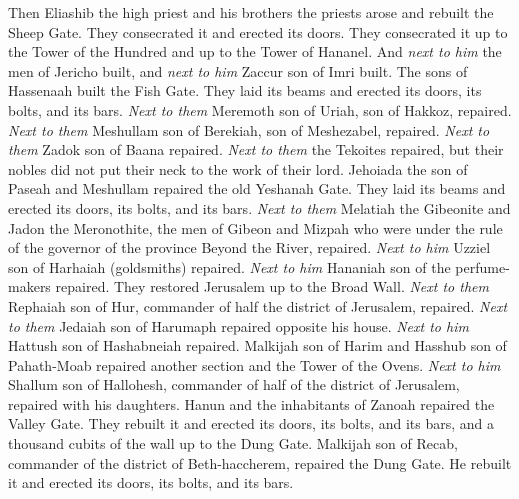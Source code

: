 \begin{biblechapter} %
 Then Eliashib the high priest and his brothers the priests arose and rebuilt the Sheep Gate. They consecrated it and erected its doors. They consecrated it up to the Tower of the Hundred and up to the Tower of Hananel.
\verse And \textit{next to him} the men of Jericho built, and \textit{next to him} Zaccur son of Imri built.
\verse The sons of Hassenaah built the Fish Gate. They laid its beams and erected its doors, its bolts, and its bars.
\verse \textit{Next to them} Meremoth son of Uriah, son of Hakkoz, repaired. \textit{Next to them} Meshullam son of Berekiah, son of Meshezabel, repaired. \textit{Next to them} Zadok son of Baana repaired.
\verse \textit{Next to them} the Tekoites repaired, but their nobles did not put their neck to the work of their lord.
\verse Jehoiada the son of Paseah and Meshullam repaired the old Yeshanah Gate. They laid its beams and erected its doors, its bolts, and its bars.
\verse \textit{Next to them} Melatiah the Gibeonite and Jadon the Meronothite, the men of Gibeon and Mizpah who were under the rule of the governor of the province Beyond the River, repaired.
\verse \textit{Next to him} Uzziel son of Harhaiah (goldsmiths) repaired. \textit{Next to him} Hananiah son of the perfume-makers repaired. They restored Jerusalem up to the Broad Wall.
\verse \textit{Next to them} Rephaiah son of Hur, commander of half the district of Jerusalem, repaired.
\verse \textit{Next to them} Jedaiah son of Harumaph repaired opposite his house. \textit{Next to him} Hattush son of Hashabneiah repaired.
\verse Malkijah son of Harim and Hasshub son of Pahath-Moab repaired another section and the Tower of the Ovens.
\verse \textit{Next to him} Shallum son of Hallohesh, commander of half of the district of Jerusalem, repaired with his daughters.
\verse Hanun and the inhabitants of Zanoah repaired the Valley Gate. They rebuilt it and erected its doors, its bolts, and its bars, and a thousand cubits of the wall up to the Dung Gate.
\verse Malkijah son of Recab, commander of the district of Beth-haccherem, repaired the Dung Gate. He rebuilt it and erected its doors, its bolts, and its bars.

\end{biblechapter}
